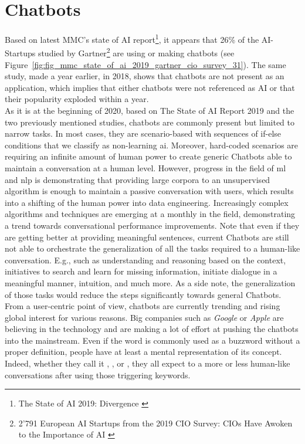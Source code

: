 \chapter{Chatbots}
\label{chap:chatbots}

Based on latest MMC's state of AI report\footnote{The State of AI 2019: Divergence \autocite{report:Kelnar2019}}, it appears that 26\% of the AI-Startups studied by Gartner\footnote{2'791 European AI Startups from the 2019 CIO Survey: CIOs Have Awoken to the Importance of AI \autocite{online:gartner_2019_ai_survey}} are using or making chatbots (see Figure~\ref{fig:fig_mmc_state_of_ai_2019_gartner_cio_survey_31}). The same study, made a year earlier, in 2018, shows that chatbots are not present as an application, which implies that either chatbots were not referenced as AI or that their popularity exploded within a year.\\

As it is at the beginning of 2020, based on The State of AI Report 2019 \autocite{studies:state_of_ai_2019} and the two previously mentioned studies, chatbots are commonly present but limited to narrow tasks. In most cases, they are scenario-based with sequences of if-else conditions that we classify as non-learning \gls{ai}. Moreover, hard-coded scenarios are requiring an infinite amount of human power to create generic Chatbots able to maintain a conversation at a human level. However, progress in the field of \gls{ml} and \gls{nlp} is demonstrating that providing large corpora to an unsupervised algorithm is enough to maintain a passive conversation with users, which results into a shifting of the human power into data engineering. Increasingly complex algorithms and techniques are emerging at a monthly in the field, demonstrating a trend towards conversational performance improvements. Note that even if they are getting better at providing meaningful sentences, current Chatbots are still not able to orchestrate the generalization of all the tasks required to a human-like conversation. E.g., such as understanding and reasoning based on the context, initiatives to search and learn for missing information, initiate dialogue in a meaningful manner, intuition, and much more. As a side note, the generalization of those tasks would reduce the steps significantly towards general Chatbots.\\

From a user-centric point of view, chatbots are currently trending and rising global interest for various reasons. Big companies such as \textit{Google} or \textit{Apple} are believing in the technology and are making a lot of effort at pushing the chatbots into the mainstream. Even if the word  is commonly used as a buzzword without a proper definition, people have at least a mental representation of its concept. Indeed, whether they call it , ,  or , they all expect to a more or less human-like conversations after using those triggering keywords.\\

